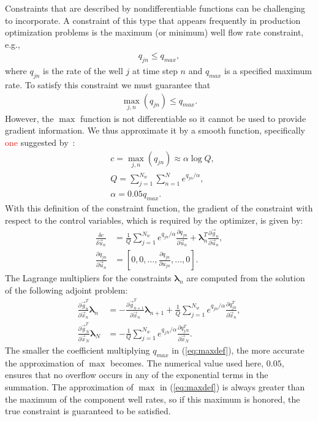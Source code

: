 \documentclass[twocolumn,numbook]{svjour3}          %
\newcommand{\red}[1]{\textcolor{red}{#1}}
\newcommand{\pder}[2]{\frac{\partial #1}{\partial #2}}
\def\u{{\vec u}}
\def\x{{\vec x}}
\def\p{{\vec{g}}}
\def\blambda{{\pmb{\lambda}}}%
\begin{document}
Constraints that are described by nondifferentiable functions can be challenging
to incorporate. A constraint of this type that appears frequently in production
optimization problems is the maximum (or minimum) well flow rate constraint,
e.g.,
%
\begin{align}
q_{jn} \leq q_{max},
\end{align}
%
where $q_{jn}$ is the rate of the well $j$ at time step $n$ and $q_{max}$ is a specified maximum rate.
To satisfy this constraint we must guarantee that
\begin{align}
\max_{j,n}{(q_{jn})} \leq q_{max}.
\end{align}
However, the $\max$ function is not differentiable 
so it cannot be used to provide
gradient information.  We thus approximate it by a smooth
function, specifically \red{one} suggested by~\cite{Bertsekas}:
%
\begin{align} \label{eq:maxdef} &c = \max_{j,n}(q_{jn}) \approx \alpha
\log{Q}, \nonumber \\
&Q = \sum_{j=1}^{N_w}\sum_{n=1}^{N} e^{q_{jn}/\alpha}, \\ 
&\alpha = 0.05 q_{max}. \end{align}
%
With this definition of the constraint
function, the gradient of the constraint with respect to the control variables,
  which is required by the optimizer, is given by:
\begin{align} \label{eq:constraintGradient} \frac{\delta c}{\delta \u_n} &=
\frac{1}{Q}\sum_{j=1}^{N_w} e^{q_{jn}/\alpha} \pder{q_{jn}}{\u_n} +\blambda^T_n\pder{\p_n}{\u_n},  
\nonumber \\
\pder{q_{jn}}{\u_{n}} &= \left [ 0, 0, \ldots, \pder{q_{jn}}{u_{jn}}, \ldots, 0 \right ].
\end{align}
%
The Lagrange multipliers for the constraints $\blambda_n$ are
computed from the solution of the following adjoint problem:
  \begin{align}
\label{eq:discreteODEConstraints}
 \pder{\p_n^T}{\x_n}  \blambda_n &= -
\pder{\p_{n+1}^T}{\x_n} \blambda_{n+1} + 
\frac{1}{Q}\sum_{j=1}^{N_w} e^{q_{jn}/\alpha} \pder{q^T_{jn}}{\x_n}, 
\\
\label{eq:discreteBCConstraints}
\pder{\p_N^T}{\x_N} \blambda_N &= -
\frac{1}{Q}\sum_{j=1}^{N_w} e^{q_{jN}/\alpha} \pder{q^T_{jN}}{\x_N}.
\end{align}
The smaller the coefficient multiplying $q_{max}$ in (\ref{eq:maxdef}), the more accurate the
approximation of $\max$ becomes. The numerical value used here, $0.05$, ensures
that no overflow occurs in any of the exponential terms in the summation. The
approximation of $\max$ in (\ref{eq:maxdef}) is always greater than the maximum
of the component well rates, so if this maximum is honored, the true constraint
is guaranteed to be satisfied.
\end{document}
